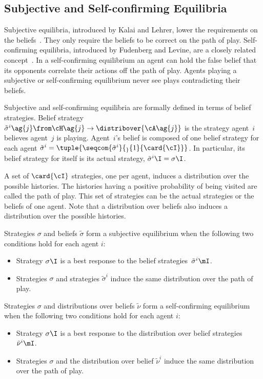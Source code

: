 \subsection{Subjective and Self-confirming Equilibria}
Subjective equilibria, introduced by Kalai and Lehrer, lower the requirements on the beliefs~\cite{kalai_lehrer:1993:subjective}.
They only require the beliefs to be correct on the path of play.
Self-confirming equilibria, introduced by Fudenberg and Levine, are a closely related concept~\cite{fudenberg_levine:1993}.
In a self-confirming equilibrium an agent can hold the false belief that its opponents correlate their actions off the path of play.
Agents playing a subjective or self-confirming equilibrium never see plays contradicting their beliefs.

\newcommand{\belief}{^}
Subjective and self-confirming equilibria are formally defined in terms of belief strategies.
Belief strategy \(\tilde{\sigma}\belief{i}\ag{j} \from \cH\ag{j} \to \distribover{\cA\ag{j}}\) is the strategy agent~\(i\) believes agent~\(j\) is playing.
Agent~\(i\)'s belief is composed of one belief strategy for each agent \(\tilde{\sigma}\belief{i} = \tuple{\seqcom{\tilde{\sigma}\belief{i}}{_}{1}{\card{\cI}}}\).
In particular, its belief strategy for itself is its actual strategy, \(\tilde{\sigma}\belief{i}\I = \sigma\I\).

A set of \(\card{\cI}\) strategies, one per agent, induces a distribution over the possible histories.
The histories having a positive probability of being visited are called the path of play.
This set of strategies can be the actual strategies or the beliefs of one agent.
Note that a distribution over beliefs also induces a distribution over the possible histories.

Strategies \(\sigma\) and beliefs \(\tilde{\sigma}\) form a subjective equilibrium when the following two conditions hold for each agent \(i\):
\begin{itemize}
\item Strategy \(\sigma\I\) is a best response to the belief strategies~\(\tilde{\sigma}\belief{i}\mI\).
\item Strategies \(\sigma\) and strategies \(\tilde{\sigma}\belief{i}\) induce the same distribution over the path of play.
\end{itemize}

Strategies \(\sigma\) and distributions over beliefs \(\tilde{\nu}\) form a self-confirming equilibrium when the following two conditions hold for each agent \(i\):
\begin{itemize}
\item Strategy \(\sigma\I\) is a best response to the distribution over belief strategies~\(\tilde{\nu}\belief{i}\mI\).
\item Strategies \(\sigma\) and the distribution over belief \(\tilde{\nu}\belief{i}\) induce the same distribution over the path of play.
\end{itemize}

